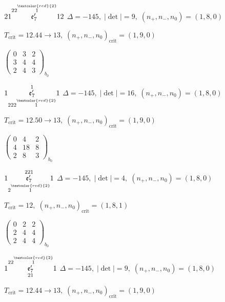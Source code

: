 \documentclass[10pt]{article}
\begin{document}
$21\overset{22\overset{\textcolor{red}{2}}{1}}{\mathfrak{e}_7'}12$ \quad $\Delta=-145,\; |\det|=9,\; (n_+,n_-,n_0)=(1,8,0)$

\hspace{1em}$T_{\text{crit}}=12.44 \to 13,\; (n_+,n_-,n_0)_{\text{crit}}=(1,9,0)$

\hspace{2em}$\left(\begin{smallmatrix}0 & 3 & 2 \\ 3 & 4 & 4 \\ 2 & 4 & 3\end{smallmatrix}\right)_{\!b_0}$

\smallskip

$1\overset{1}{\underset{222\overset{\textcolor{red}{2}}{1}}{\mathfrak{e}_7'}}1$ \quad $\Delta=-145,\; |\det|=16,\; (n_+,n_-,n_0)=(1,8,0)$

\hspace{1em}$T_{\text{crit}}=12.50 \to 13,\; (n_+,n_-,n_0)_{\text{crit}}=(1,9,0)$

\hspace{2em}$\left(\begin{smallmatrix}0 & 4 & 2 \\ 4 & 18 & 8 \\ 2 & 8 & 3\end{smallmatrix}\right)_{\!b_0}$

\smallskip

$1\overset{221}{\underset{2\overset{\textcolor{red}{2}}{1}}{\mathfrak{e}_7'}}1$ \quad $\Delta=-145,\; |\det|=4,\; (n_+,n_-,n_0)=(1,8,0)$

\hspace{1em}$T_{\text{crit}}=12,\; (n_+,n_-,n_0)_{\text{crit}}=(1,8,1)$

\hspace{2em}$\left(\begin{smallmatrix}0 & 2 & 2 \\ 2 & 4 & 4 \\ 2 & 4 & 4\end{smallmatrix}\right)_{\!b_0}$

$1\overset{22\overset{\textcolor{red}{2}}{1}}{\underset{21}{\mathfrak{e}_7'}}1$ \quad $\Delta=-145,\; |\det|=9,\; (n_+,n_-,n_0)=(1,8,0)$

\hspace{1em}$T_{\text{crit}}=12.44 \to 13,\; (n_+,n_-,n_0)_{\text{crit}}=(1,9,0)$
\end{document}
